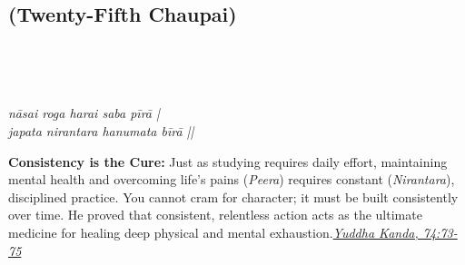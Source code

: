 \subsection*{ (Twenty-Fifth Chaupai)}

\begin{minipage}[t]{0.55\textwidth}
\vspace{0pt}

{\large \linespread{1.5}\selectfont
{}\\
\par}

\vspace{0.5em}

{\large \linespread{1.5}\selectfont
{}\\
\par}

\vspace{0.5em}

{\large \linespread{1.3}\selectfont
\textit{nāsai roga harai saba pīrā |}\\
\textit{japata nirantara hanumata bīrā ||}
\par}
\end{minipage}%
\hfill
\begin{minipage}[t]{0.42\textwidth}
\vspace{0pt}
\begin{tcolorbox}[anchorbox]
\textbf{Consistency is the Cure:} Just as studying requires daily effort, maintaining mental health and overcoming life's pains (\textit{Peera}) requires constant (\textit{Nirantara}), disciplined practice. You cannot cram for character; it must be built consistently over time.
\vspace{0.5em}\newline He proved that consistent, relentless action acts as the ultimate medicine for healing deep physical and mental exhaustion.\newline\null\hfill\href{https://www.valmiki.iitk.ac.in/sloka?field_kanda_tid=6&language=dv&field_sarga_value=74}{\textit{Yuddha Kanda, 74:73-75}}
\end{tcolorbox}
\end{minipage}

\vspace{0.5em}
